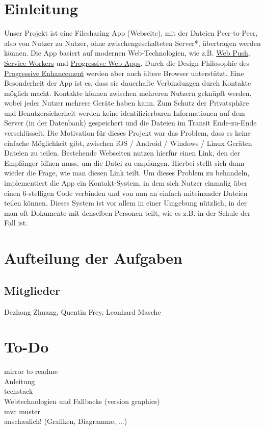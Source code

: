 \documentclass[a4paper]{article}
\begin{document}
  

  \setcounter{tocdepth}{1}
  \tableofcontents
  \newpage

  \section{Einleitung}
  Unser Projekt ist eine Filesharing App (Webseite), mit der Dateien Peer-to-Peer, also von Nutzer zu Nutzer, ohne zwischengeschalteten Server*, übertragen werden können.
  Die App basiert auf modernen Web-Technologien, wie z.B. \href{https://web.dev/push-notifications-web-push-protocol/}{Web Push}, \href{https://web.dev/learn/pwa/service-workers/}{Service Workers} und \href{https://web.dev/progressive-web-apps/}{Progressive Web Apps}.
  Durch die Design-Philosophie des \href{https://developer.mozilla.org/en-US/docs/Glossary/Progressive_Enhancement}{Progressive Enhancement} werden aber auch ältere Browser unterstützt. Eine Besonderheit der App ist es, dass sie dauerhafte Verbindungen durch Kontakte möglich macht. Kontakte können zwischen mehreren Nutzern geknüpft werden, wobei jeder Nutzer mehrere Geräte haben kann. Zum Schutz der Privatsphäre und Benutzersicherheit werden keine identifizierbaren Informationen auf dem Server (in der Datenbank) gespeichert und die Dateien im Transit Ende-zu-Ende verschlüsselt.
  Die Motivation für dieses Projekt war das Problem, dass es keine einfache Möglichkeit gibt, zwischen iOS / Android / Windows / Linux Geräten Dateien zu teilen. Bestehende Webseiten nutzen hierfür einen Link, den der Empfänger öffnen muss, um die Datei zu empfangen. Hierbei stellt sich dann wieder die Frage, wie man diesen Link teilt. Um dieses Problem zu behandeln, implementiert die App ein Kontakt-System, in dem sich Nutzer einmalig über einen 6-stelligen Code verbinden und von nun an einfach miteinander Dateien teilen können. Dieses System ist vor allem in einer Umgebung nützlich, in der man oft Dokumente mit denselben Personen teilt, wie es z.B. in der Schule der Fall ist.

  \section{Aufteilung der Aufgaben}

  \subsection*{Mitglieder}
  Dezhong Zhuang, Quentin Frey, Leonhard Masche

  \section{To-Do}
  mirror to readme\\
  Anleitung\\
  techstack\\
  Webtechnologien und Fallbacks (version graphics)\\
  mvc muster\\
  anschaulich! (Grafiken, Diagramme, ...)
\end{document}
